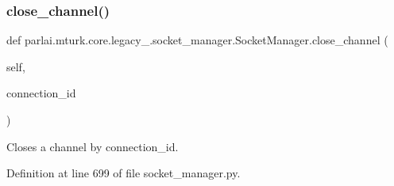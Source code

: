 \subsubsection{\texorpdfstring{close\+\_\+channel()}{close\_channel()}}
{\footnotesize\ttfamily def parlai.\+mturk.\+core.\+legacy\+\_.\+socket\+\_\+manager.\+Socket\+Manager.\+close\+\_\+channel (\begin{DoxyParamCaption}\item[{}]{self,  }\item[{}]{connection\+\_\+id }\end{DoxyParamCaption})}

\begin{DoxyVerb}Closes a channel by connection_id.
\end{DoxyVerb}
 

Definition at line 699 of file socket\+\_\+manager.\+py.


